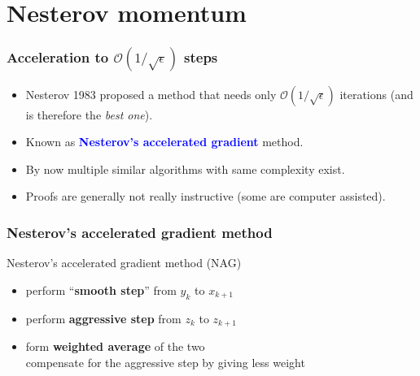 \documentclass[aspectratio=149]{beamer}
\begin{document}
\section{Nesterov momentum}%
\label{sec:}

\begin{frame}
  \frametitle{Acceleration to $\mathcal{O}(1/\sqrt{\epsilon})$ steps}

  \begin{itemize}
    \item Nesterov 1983 proposed a method that needs only $\mathcal{O}(1/\sqrt{\epsilon})$ iterations (and is therefore the \textit{best one}).
    \item Known as \textcolor{blue}{\textbf{Nesterov's accelerated gradient}} method.
    \item By now multiple similar algorithms with same complexity exist.
    \item Proofs are generally not really instructive (some are computer assisted).
  \end{itemize}

\end{frame}


\begin{frame}
  \frametitle{Nesterov's accelerated gradient method}
  \begin{algorithm}[H]
    \caption{Nesterov's accelerated gradient method (NAG)}
    \begin{algorithmic}[1]
      \EndFor{}
    \end{algorithmic}
  \end{algorithm}


  \begin{itemize}
    \item perform ``\textbf{smooth step}'' from $y_k$ to $x_{k+1}$
    \item perform \textbf{aggressive step} from $z_k$ to $z_{k+1}$
    \item form \textbf{weighted average} of the two\\
          compensate for the aggressive step by giving less weight
  \end{itemize}

\end{frame}
\end{document}
